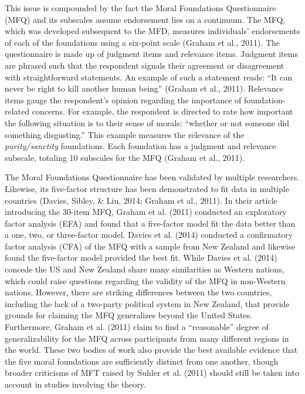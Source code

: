 \documentclass[english,,man]{apa6}
\begin{document}
This issue is compounded by the fact the Moral Foundations Questionnaire (MFQ) and its subscales assume endorsement lies on a continuum. The MFQ, which was developed subsequent to the MFD, measures individuals' endorsements of each of the foundations using a six-point scale (Graham et al., 2011). The questionnaire is made up of judgment items and relevance items. Judgment items are phrased such that the respondent signals their agreement or disagreement with straightforward statements. An example of such a statement reads: \enquote{It can never be right to kill another human being} (Graham et al., 2011). Relevance items gauge the respondent's opinion regarding the importance of foundation-related concerns. For example, the respondent is directed to rate how important the following situation is to their sense of morals: \enquote{whether or not someone did something disgusting.} This example measures the relevance of the \emph{purity/sanctity} foundations. Each foundation has a judgment and relevance subscale, totaling 10 subscales for the MFQ (Graham et al., 2011).

The Moral Foundations Questionnaire has been validated by multiple researchers. Likewise, its five-factor structure has been demonstrated to fit data in multiple countries (Davies, Sibley, \& Liu, 2014; Graham et al., 2011). In their article introducing the 30-item MFQ, Graham et al. (2011) conducted an exploratory factor analysis (EFA) and found that a five-factor model fit the data better than a one, two, or three-factor model. Davies et al. (2014) conducted a confirmatory factor analysis (CFA) of the MFQ with a sample from New Zealand and likewise found the five-factor model provided the best fit. While Davies et al. (2014) concede the US and New Zealand share many similarities as Western nations, which could raise questions regarding the validity of the MFQ in non-Western nations. However, there are striking differences between the two countries, including the lack of a two-party political system in New Zealand, that provide grounds for claiming the MFQ generalizes beyond the United States. Furthermore, Graham et al. (2011) claim to find a \enquote{reasonable} degree of generalizability for the MFQ across participants from many different regions in the world. These two bodies of work also provide the best available evidence that the five moral foundations are sufficiently distinct from one another, though broader criticisms of MFT raised by Suhler et al. (2011) should still be taken into account in studies involving the theory.
\end{document}
